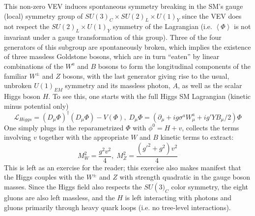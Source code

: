 This non-zero VEV induces spontaneous symmetry breaking in the SM's gauge (local) symmetry group of $SU\left(3\right)_C\times SU\left(2\right)_L\times U\left(1\right)_Y$ since the VEV does not respect the $SU\left(2\right)_L\times U\left(1\right)_Y$ symmetry of the Lagrangian (i.e. $\left<\Phi\right>$ is not invariant under a gauge transformation of this group).  Three of the four generators of this subgroup are spontaneously broken, which implies the existence of three massless Goldstone bosons, which are in turn ``eaten'' by linear combinations of the $W^a$ and $B$ bosons to form the longitudinal components of the familiar $W^{\pm}$ and $Z$ bosons, with the last generator giving rise to the usual, unbroken $U\left(1\right)_{EM}$ symmetry and its massless photon, $A$, as well as the scalar Higgs boson $H$.  To see this, one starts with the full Higgs SM Lagrangian (kinetic minus potential only)
\begin{equation}
\mathcal{L}_{Higgs}=\left(D_{\mu}\Phi\right)^\dagger\left(D_{\mu}\Phi\right)-V\left(\Phi\right),\; D_{\mu}\Phi = \left(\partial_{\mu}+ig\sigma^a W^a_\mu + ig'YB_\mu/2\right)\Phi
\end{equation}
One simply plugs in the reparametrized $\Phi$ with $\phi^0=H+v$, collects the terms involving $v$ together with the appropriate $W$ and $B$ kinetic terms to extract:
\begin{equation}
M_W^2=\frac{g^2v^2}{4},\;M_Z^2=\frac{\left(g'^2+g^2\right)v^2}{4}
\end{equation}
This is left as an exercise for the reader; this exercise also makes manifest that the Higgs couples with the $W^\pm$ and $Z$ with strength quadratic in the gauge boson masses.  Since the Higgs field also respects the $SU\left(3)_C$ color symmetry, the eight gluons are also left massless, and the $H$ is left interacting with photons and gluons primarily through heavy quark loops (i.e. no tree-level interactions).

